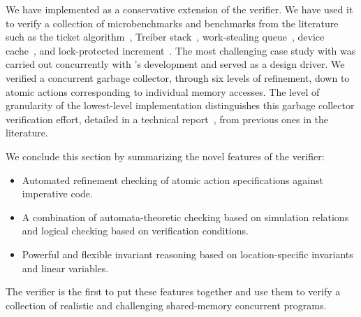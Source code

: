 We have implemented \civl as a conservative extension of the \boogie verifier.  
We have used it to verify a collection of microbenchmarks and benchmarks from the literature such as the ticket algorithm~\cite{ticket}, Treiber stack~\cite{treiber}, work-stealing queue~\cite{wsq},
device cache~\cite{device-cache}, and lock-protected increment~\cite{incr}. 
The most challenging case study with \civl was carried out concurrently with \civl's development and served as a design driver. 
We verified a concurrent garbage collector, through six levels of refinement, down to atomic actions corresponding to individual memory accesses. The level of granularity of the lowest-level implementation distinguishes this garbage collector verification effort, detailed in a technical report~\cite{gc-techreport}, from previous ones in the literature. 

We conclude this section by summarizing the novel features of the \civl verifier:
\begin{itemize}
\item Automated refinement checking of atomic action specifications against imperative code.
\item A combination of automata-theoretic checking based on simulation relations and logical checking based on verification conditions.
\item Powerful and flexible invariant reasoning based on location-specific invariants and linear variables.
\end{itemize}
The \civl verifier is the first to put these features together and use them to verify a collection of realistic and challenging shared-memory
concurrent programs.